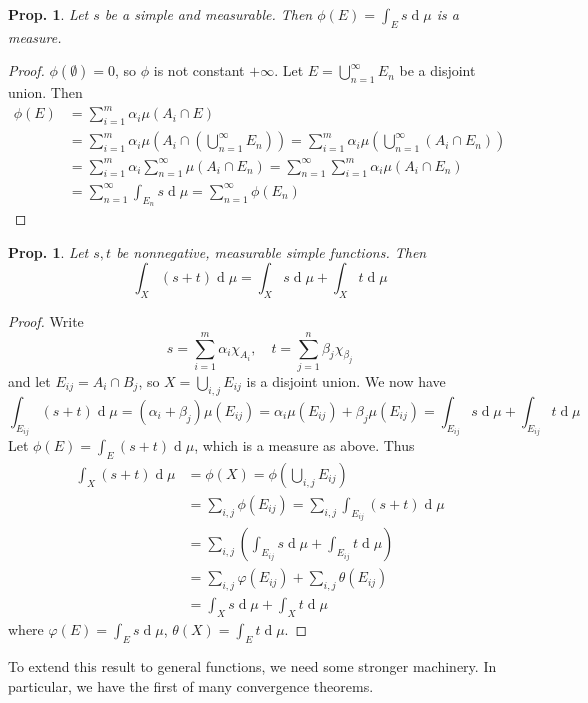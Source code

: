 \documentclass[12pt, a4paper]{book}
\renewcommand{\d}[1]{\ensuremath{\operatorname{d}\!{#1}}} %
\newtheorem{proposition}[theorem]{Prop.}
\theoremstyle{nonumberplain}
\newtheorem{proof}{Proof}
\begin{document}
\begin{proposition}
    Let $s$ be a simple and measurable.
    Then $\phi(E)=\int_Es\d{\mu}$ is a measure.
\end{proposition}
\begin{proof}
    $\phi(\emptyset)=0$, so $\phi$ is not constant $+\infty$.
    Let $E=\bigcup_{n=1}^\infty E_n$ be a disjoint union.
    Then
    \begin{align*}
        \phi(E) &=\sum\limits_{i=1}^m\alpha_i\mu(A_i\cap E)\\
                &=\sum\limits_{i=1}^m\alpha_i\mu\left(A_i\cap\left(\bigcup\limits_{n=1}^\infty E_n\right)\right)= \sum\limits_{i=1}^m\alpha_i\mu\left(\bigcup\limits_{n=1}^\infty(A_i\cap E_n)\right)\\
                &= \sum\limits_{i=1}^m\alpha_i\sum\limits_{n=1}^\infty\mu(A_i\cap E_n)= \sum\limits_{n=1}^\infty\sum\limits_{i=1}^m\alpha_i\mu(A_i\cap E_n)\\
                &= \sum\limits_{n=1}^\infty \int_{E_n}s\d{\mu}= \sum\limits_{n=1}^\infty \phi(E_n)
    \end{align*}
\end{proof}
\begin{proposition}
    Let $s,t$ be nonnegative, measurable simple functions.
    Then
    \[\int_X(s+t)\d{\mu}=\int_X s\d{\mu}+\int_X t\d{\mu}\]
\end{proposition}
\begin{proof}
    Write
    \begin{equation*}s=\sum\limits_{i=1}^m\alpha_i \chi_{A_i},\quad t=\sum\limits_{j=1}^n \beta_j \chi_{\beta_j}\end{equation*}
    and let $E_{ij}=A_i\cap B_j$, so $X=\bigcup_{i,j} E_{ij}$ is a disjoint union.
    We now have
    \begin{equation*}\int_{E_{ij}}(s+t)\d{\mu}=(\alpha_i+\beta_j)\mu(E_{ij})=\alpha_i\mu(E_{ij})+\beta_j\mu(E_{ij})=\int_{E_{ij}}s\d{\mu}+\int_{E_{ij}}t\d{\mu}\end{equation*}
    Let $\phi(E)=\int_E(s+t)\d{\mu}$, which is a measure as above.
    Thus
    \begin{align*}
        \int_X(s+t)\d{\mu} &= \phi(X)=\phi\left(\bigcup_{i,j}E_{ij}\right)\\
                           &= \sum\limits_{i,j}\phi(E_{ij})=\sum\limits_{i,j}\int_{E_{ij}}(s+t)\d{\mu}\\
                           &= \sum\limits_{i,j}\left(\int_{E_{ij}}s\d{\mu}+\int_{E_{ij}}t\d{\mu}\right)\\
                           &= \sum\limits_{i,j}\varphi(E_{ij})+\sum\limits_{i,j}\theta(E_{ij})\\
                           &= \int_Xs\d{\mu}+\int_X t\d{\mu}
    \end{align*}
    where $\varphi(E)=\int_E s\d{\mu}$, $\theta(X)=\int_E t\d{\mu}$.
\end{proof}
To extend this result to general functions, we need some stronger machinery.
In particular, we have the first of many convergence theorems.
\end{document}
